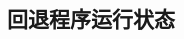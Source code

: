 \documentclass[class=book, crop=false]{standalone}
\begin{document}
\begin{CJK}{UTF8}{gbsn}

\chapter{回退程序运行状态}



\cleardoublepage

\end{CJK}
\end{document}
